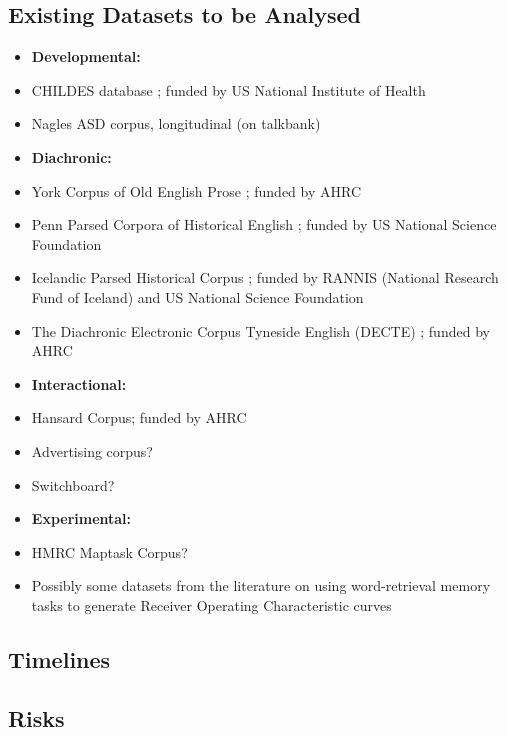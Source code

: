 \documentclass[11pt]{article}
\begin{document}
\subsection{Existing Datasets to be Analysed}
\begin{itemize}
	\item[] \textbf{Developmental:}
	\item CHILDES database \citep{macwhinney1996,macwhinney2014}; funded by US National Institute of Health
	\item Nagles ASD corpus, longitudinal (on talkbank)
	\item[] \textbf{Diachronic:}
	\item York Corpus of Old English Prose \citep{ycoe}; funded by AHRC
	\item Penn Parsed Corpora of Historical English \citep{ppcme24, ppceme, ppcmbe2}; funded by US National Science Foundation
	\item Icelandic Parsed Historical Corpus \citep{icepahc09}; funded by RANNIS (National Research Fund of Iceland) and US National Science Foundation
	\item The Diachronic Electronic Corpus Tyneside English (DECTE) \cite{decte}; funded by AHRC
	\item[] \textbf{Interactional:}
	\item Hansard Corpus; funded by AHRC
	\item Advertising corpus?
	\item Switchboard?
	\item[] \textbf{Experimental:}
	\item HMRC Maptask Corpus?
	\item Possibly some datasets from the literature on using word-retrieval memory tasks to generate Receiver Operating Characteristic curves
\end{itemize}

\subsection{Timelines}

\subsection{Risks}
\end{document}
